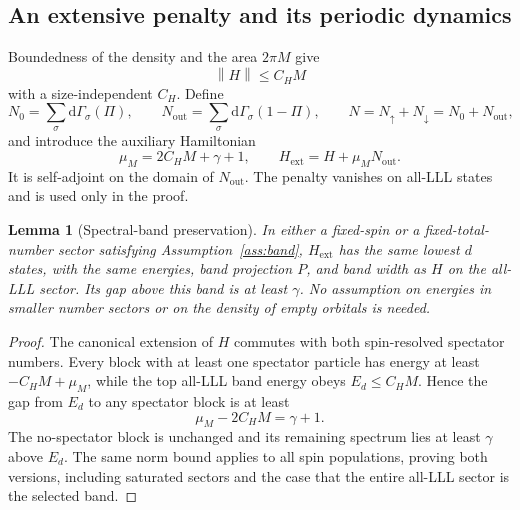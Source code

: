 \documentclass[11pt]{article}
\newtheorem{lemma}[theorem]{Lemma}
\theoremstyle{definition}
\theoremstyle{remark}
\newcommand{\dG}{\mathrm d\Gamma}
\newcommand{\up}{\uparrow}
\newcommand{\dn}{\downarrow}
\newcommand{\norm}[1]{\left\lVert#1\right\rVert}
\begin{document}
\subsection{An extensive penalty and its periodic dynamics}
\label{sec:enlargement}

Boundedness of the density and the area \(2\pi M\) give
\begin{equation}\label{eq:Hnorm}
 \norm H\le C_HM
\end{equation}
with a size-independent \(C_H\).  Define
\[
 N_0=\sum_\sigma\dG_\sigma(\Pi),\qquad
 N_{\mathrm{out}}=\sum_\sigma\dG_\sigma(1-\Pi),\qquad
 N=N_\up+N_\dn=N_0+N_{\mathrm{out}},
\]
and introduce the auxiliary Hamiltonian
\begin{equation}\label{eq:penalty}
 \mu_M=2C_HM+\gamma+1,\qquad
 H_{\mathrm{ext}}=H+\mu_M N_{\mathrm{out}}.
\end{equation}
It is self-adjoint on the domain of \(N_{\mathrm{out}}\).
The penalty vanishes on all-LLL states and is used only in the proof.

\begin{lemma}[Spectral-band preservation]\label{lem:generalcomparison}
In either a fixed-spin or a fixed-total-number sector satisfying
Assumption~\ref{ass:band}, \(H_{\mathrm{ext}}\) has the same
lowest \(d\) states, with the same energies, band projection \(P\),
and band width as \(H\) on the all-LLL sector.  Its gap above
this band is at least \(\gamma\).  No assumption on energies
in smaller number sectors or on the density of empty orbitals is needed.
\end{lemma}
\begin{proof}
The canonical extension of \(H\) commutes with both spin-resolved
spectator numbers.  Every block with at least one spectator particle
has energy at least \(-C_HM+\mu_M\), while the top all-LLL band
energy obeys \(E_d\le C_HM\).  Hence the gap from \(E_d\) to
any spectator block is at least
\[
 \mu_M-2C_HM=\gamma+1.
\]
The no-spectator block is unchanged and its remaining spectrum lies
at least \(\gamma\) above \(E_d\).  The same norm bound applies
to all spin populations, proving both versions, including saturated
sectors and the case that the entire all-LLL sector is the selected band.
\end{proof}
\end{document}
